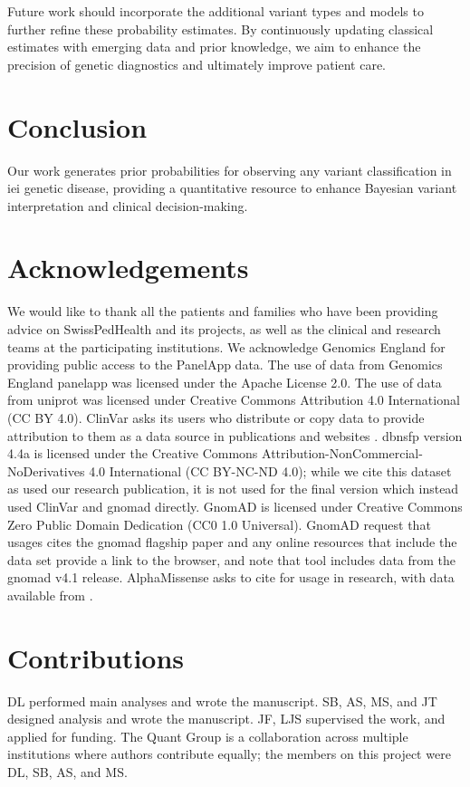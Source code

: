 Future work should incorporate the additional variant types and models to further refine these probability estimates. 
By continuously updating classical estimates with emerging data and prior knowledge, we aim to enhance the precision of genetic diagnostics and ultimately improve patient care.

\clearpage
\section{Conclusion}
Our work generates prior probabilities for observing any variant classification in \ac{iei} genetic disease, providing a quantitative resource to enhance Bayesian variant interpretation and clinical decision-making.

\section*{Acknowledgements}
\noindent
We would like to thank all the patients and families who have been providing advice on SwissPedHealth and its projects, as well as the clinical and research teams at the participating institutions.
We acknowledge Genomics England for providing public access to the PanelApp data.
The use of data from Genomics England panelapp was licensed under the Apache License 2.0.
The use of data from \ac{uniprot} was licensed under Creative Commons Attribution 4.0 International (CC BY 4.0).
ClinVar asks its users who distribute or copy data to provide attribution to them as a data source in publications and websites \cite{landrum_clinvar_2018}.
\ac{dbnsfp} version 4.4a is licensed under the Creative Commons Attribution-NonCommercial-NoDerivatives 4.0 International (CC BY-NC-ND 4.0); while we cite this dataset as used our research publication, it is not used for the final version which instead used ClinVar and \ac{gnomad} directly.
GnomAD is licensed under  Creative Commons  Zero Public Domain Dedication (CC0 1.0 Universal).
GnomAD request that usages cites the \ac{gnomad} flagship paper \cite{karczewski2020mutational}
and any online resources that include the data set provide a link to the browser, and note that tool includes data from the \ac{gnomad} v4.1 release.
AlphaMissense asks to cite \citet{cheng_accurate_2023} for usage in research, with data available from \citet{jun_cheng_2023_8208688}.


\section*{Contributions}
\noindent 
DL performed main analyses and wrote the manuscript.
SB, AS, MS, and JT designed analysis and wrote the manuscript.
JF, LJS supervised the work, and applied for funding.
The Quant Group is a collaboration across multiple institutions where authors contribute equally; the members on this project were DL, SB, AS, and MS.

